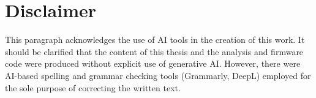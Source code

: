 
\vspace*{\fill} %
\section*{Disclaimer}
This paragraph acknowledges the use of \ac{AI} tools in the creation of this work. It should be clarified that the content of this thesis and the analysis and firmware code were produced without explicit use of generative \ac{AI}. However, there were \ac{AI}-based spelling and grammar checking tools (Grammarly, DeepL) employed for the sole purpose of correcting the written text. 
\vspace{3em}


